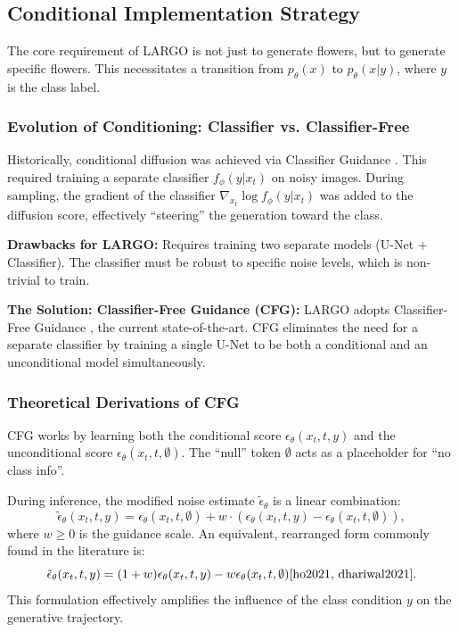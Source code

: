 \documentclass[12pt, a4paper]{article}
\begin{document}
\subsection{Conditional Implementation Strategy}

The core requirement of LARGO is not just to generate flowers, but to generate specific flowers. This necessitates a transition from $p_\theta(x)$ to $p_\theta(x|y)$, where $y$ is the class label.

\subsubsection{Evolution of Conditioning: Classifier vs. Classifier-Free}
Historically, conditional diffusion was achieved via Classifier Guidance \cite{dhariwal2021}. This required training a separate classifier $f_\phi(y|x_t)$ on noisy images. During sampling, the gradient of the classifier $\nabla_{x_t} \log f_\phi(y|x_t)$ was added to the diffusion score, effectively ``steering'' the generation toward the class.

\textbf{Drawbacks for LARGO:} Requires training two separate models (U-Net + Classifier). The classifier must be robust to specific noise levels, which is non-trivial to train.

\textbf{The Solution: Classifier-Free Guidance (CFG):} LARGO adopts Classifier-Free Guidance \cite{ho2021}, the current state-of-the-art. CFG eliminates the need for a separate classifier by training a single U-Net to be both a conditional and an unconditional model simultaneously.

\subsubsection{Theoretical Derivations of CFG}
CFG works by learning both the conditional score $\epsilon_\theta(x_t, t, y)$ and the unconditional score $\epsilon_\theta(x_t, t, \emptyset)$. The ``null'' token $\emptyset$ acts as a placeholder for ``no class info''.

During inference, the modified noise estimate $\tilde{\epsilon}_\theta$ is a linear combination:
\begin{equation}
\tilde{\epsilon}_\theta(x_t, t, y) = \epsilon_\theta(x_t, t, \emptyset) + w \cdot (\epsilon_\theta(x_t, t, y) - \epsilon_\theta(x_t, t, \emptyset)),
\end{equation}
where $w \geq 0$ is the guidance scale. An equivalent, rearranged form commonly found in the literature is:
\begin{equation}
\tilde{\epsilon}_\theta (x_t,t,y) = (1+w) \epsilon_\theta(x_t, t, y) - w \epsilon_\theta(x_t, t, \emptyset) \cite{ho2021, dhariwal2021}.
\end{equation}
This formulation effectively amplifies the influence of the class condition $y$ on the generative trajectory.
\end{document}
